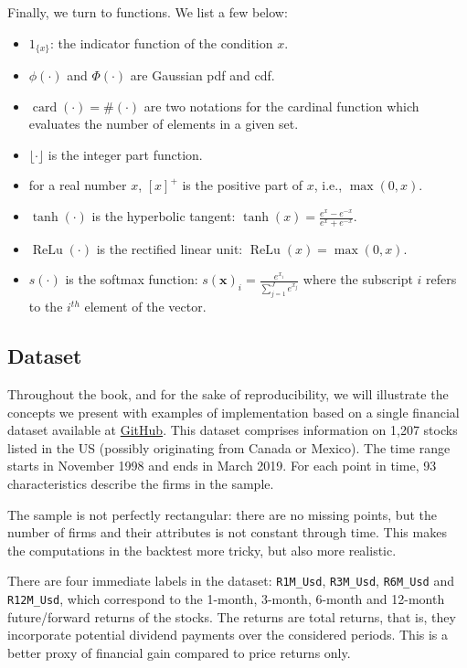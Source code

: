 Finally, we turn to functions. We list a few below:
\begin{itemize}
    \item $1_{\{ x \}}$: the indicator function of the condition $x$.
    \item $\phi( \cdot )$ and $\Phi( \cdot )$ are Gaussian pdf and cdf.
    \item $\operatorname{card}( \cdot ) = \#( \cdot )$ are two notations for the cardinal function which evaluates the number of elements in a given set.
    \item $\lfloor \cdot \rfloor$ is the integer part function.
    \item for a real number $x$, $[x]^{+}$ is the positive part of $x$, i.e., $\max(0,x)$.
    \item $\tanh( \cdot )$ is the hyperbolic tangent: $\tanh (x) = \frac{e^{ x }-e^{ -x }}{e^{ x }+e^{ -x }}$.
    \item $\operatorname{ReLu}( \cdot )$ is the rectified linear unit: $\operatorname{ReLu}( x ) = \max(0,x)$.
    \item $s( \cdot )$ is the softmax function: $s(\mathbf{x})_{i} = \frac{e^{ x_{i} }}{\sum _{j=1}^{J}e^{x_{j}}}$ where the subscript $i$ refers to the $i^{th}$ element of the vector.
\end{itemize}


\subsection{Dataset}
Throughout the book, and for the sake of reproducibility, we will illustrate the concepts we present with examples of implementation based on a single financial dataset available at \href{https://github.com/shokru/mlfactor.github.io/tree/master/material}{GitHub}. This dataset comprises information on 1,207 stocks listed in the US (possibly originating from Canada or Mexico). The time range starts in November 1998 and ends in March 2019. For each point in time, 93 characteristics describe the firms in the sample.

The sample is not perfectly rectangular: there are no missing points, but the number of firms and their attributes is not constant through time. This makes the computations in the backtest more tricky, but also more realistic.

There are four immediate labels in the dataset: \texttt{R1M\_Usd}, \texttt{R3M\_Usd}, \texttt{R6M\_Usd} and \texttt{R12M\_Usd}, which correspond to the 1-month, 3-month, 6-month and 12-month future/forward returns of the stocks. The returns are total returns, that is, they incorporate potential dividend payments over the considered periods. This is a better proxy of financial gain compared to price returns only.

